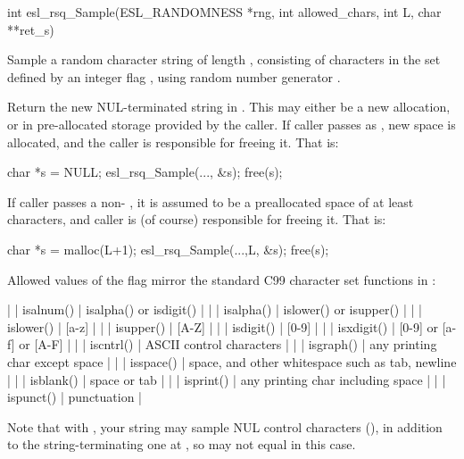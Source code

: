 \begin{sreapi}
\hypertarget{func:esl_rsq_Sample()}
{\item[int esl\_rsq\_Sample(ESL\_RANDOMNESS *rng, int allowed\_chars, int L, char **ret\_s)]}

Sample a random character string of length , 
consisting of characters in the set defined by
an integer flag , using 
random number generator . 

Return the new NUL-terminated string in .  This
may either be a new allocation, or in pre-allocated
storage provided by the caller. If caller passes
 as , new space is allocated, and the
caller is responsible for freeing it. That is: 
\begin{cchunk}
char *s  = NULL; 
esl_rsq_Sample(..., &s); 
free(s);
\end{cchunk}

If caller passes a non- , it is assumed to
be a preallocated space of at least  characters,
and caller is (of course) responsible for freeing
it. That is: 
\begin{cchunk}
char *s = malloc(L+1);
esl_rsq_Sample(...,L, &s);
free(s);
\end{cchunk}

Allowed values of the flag  mirror
the standard C99 character set functions in :

|   |  isalnum()  | isalpha() or isdigit() |
|   |  isalpha()  | islower() or isupper() |
|   |  islower()  | [a-z] |
|   |  isupper()  | [A-Z] |
|   |  isdigit()  | [0-9] |
|  |  isxdigit() | [0-9] or [a-f] or [A-F] |
|   |  iscntrl()  | ASCII control characters |
|   |  isgraph()  | any printing char except space |
|   |  isspace()  | space, and other whitespace such as tab, newline |
|   |  isblank()  | space or tab |
|   |  isprint()  | any printing char including space |
|   |  ispunct()  | punctuation |

Note that with , your string
may sample NUL control characters (), in addition to
the string-terminating one at , so 
may not equal  in this case. 


\end{sreapi}
